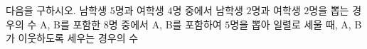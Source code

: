 다음을 구하시오.
 남학생 $5$명과 여학생 $4$명 중에서 남학생 $2$명과 여학생 \mbox{$2$명을} 뽑는 경우의 수
 A, B를 포함한 $8$명 중에서 A, B를 포함하여 $5$명을 뽑아 일렬로 세울 때, A, B가 이웃하도록 세우는 경우의 수
